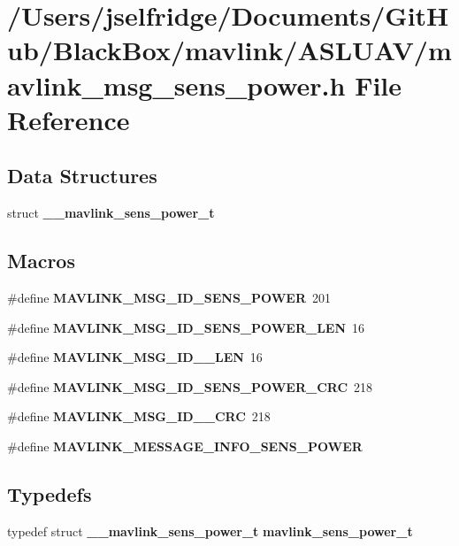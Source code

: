 \section{/\+Users/jselfridge/\+Documents/\+Git\+Hub/\+Black\+Box/mavlink/\+A\+S\+L\+U\+A\+V/mavlink\+\_\+msg\+\_\+sens\+\_\+power.h File Reference}
\label{mavlink__msg__sens__power_8h}
\subsection*{Data Structures}
\begin{DoxyCompactItemize}
\item 
struct \textbf{ \+\_\+\+\_\+mavlink\+\_\+sens\+\_\+power\+\_\+t}
\end{DoxyCompactItemize}
\subsection*{Macros}
\begin{DoxyCompactItemize}
\item 
\#define \textbf{ M\+A\+V\+L\+I\+N\+K\+\_\+\+M\+S\+G\+\_\+\+I\+D\+\_\+\+S\+E\+N\+S\+\_\+\+P\+O\+W\+ER}~201
\item 
\#define \textbf{ M\+A\+V\+L\+I\+N\+K\+\_\+\+M\+S\+G\+\_\+\+I\+D\+\_\+\+S\+E\+N\+S\+\_\+\+P\+O\+W\+E\+R\+\_\+\+L\+EN}~16
\item 
\#define \textbf{ M\+A\+V\+L\+I\+N\+K\+\_\+\+M\+S\+G\+\_\+\+I\+D\+\_\+\_\+\+L\+EN}~16
\item 
\#define \textbf{ M\+A\+V\+L\+I\+N\+K\+\_\+\+M\+S\+G\+\_\+\+I\+D\+\_\+\+S\+E\+N\+S\+\_\+\+P\+O\+W\+E\+R\+\_\+\+C\+RC}~218
\item 
\#define \textbf{ M\+A\+V\+L\+I\+N\+K\+\_\+\+M\+S\+G\+\_\+\+I\+D\+\_\+\_\+\+C\+RC}~218
\item 
\#define \textbf{ M\+A\+V\+L\+I\+N\+K\+\_\+\+M\+E\+S\+S\+A\+G\+E\+\_\+\+I\+N\+F\+O\+\_\+\+S\+E\+N\+S\+\_\+\+P\+O\+W\+ER}
\end{DoxyCompactItemize}
\subsection*{Typedefs}
\begin{DoxyCompactItemize}
\item 
typedef struct \textbf{ \+\_\+\+\_\+mavlink\+\_\+sens\+\_\+power\+\_\+t} \textbf{ mavlink\+\_\+sens\+\_\+power\+\_\+t}
\end{DoxyCompactItemize}


